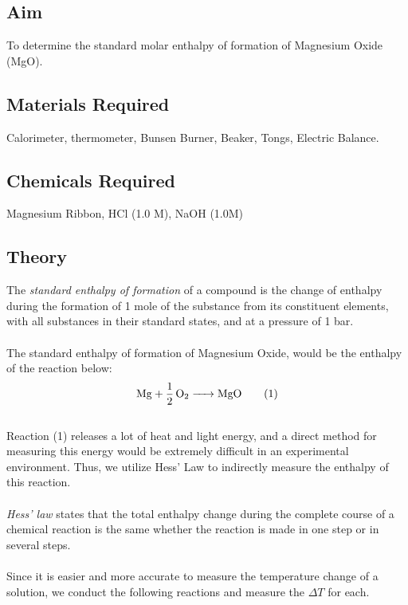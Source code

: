 \subsection{Aim}
To determine the standard molar enthalpy of formation of Magnesium Oxide (MgO).
\subsection{Materials Required}
Calorimeter, thermometer, Bunsen Burner, Beaker, Tongs, Electric Balance.
\subsection{Chemicals Required}
Magnesium Ribbon, HCl (1.0 M), NaOH (1.0M)

\subsection{Theory}
The \emph{standard enthalpy of formation} of a compound is the change of enthalpy during the formation of 1 mole of the substance from its constituent elements, with all substances in their standard states, and at a pressure of 1 bar.
\\ \\
The standard enthalpy of formation of Magnesium Oxide, would be the enthalpy of the reaction below:
\[ 
  \ce{Mg + 1/2O2 -> MgO} \tag{1}\label{1}
 \]
 \\
Reaction (1) releases a lot of heat and light energy, and a direct method for measuring this energy would be extremely difficult in an experimental environment. Thus, we utilize Hess’ Law to indirectly measure the enthalpy of this reaction.
 \\ \\
\emph{Hess' law} states that the total enthalpy change during the complete course of a chemical reaction is the same whether the reaction is made in one step or in several steps.
 \\ \\
Since it is easier and more accurate to measure the temperature change of a solution, we conduct the following reactions and measure the $\Delta T$ for each.
\cleardoublepage

